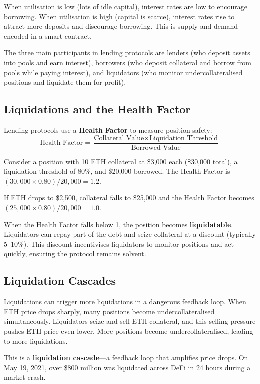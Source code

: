 \documentclass[11pt,a4paper]{article}
\newcommand{\keyword}[1]{\textbf{\textcolor{AccentOrange}{#1}}}
\begin{document}
When utilisation is low (lots of idle capital), interest rates are low to encourage borrowing. When utilisation is high (capital is scarce), interest rates rise to attract more deposits and discourage borrowing. This is supply and demand encoded in a smart contract.

The three main participants in lending protocols are lenders (who deposit assets into pools and earn interest), borrowers (who deposit collateral and borrow from pools while paying interest), and liquidators (who monitor undercollateralised positions and liquidate them for profit).

\subsection{Liquidations and the Health Factor}

Lending protocols use a \keyword{Health Factor} to measure position safety:
\[
\text{Health Factor} = \frac{\text{Collateral Value} \times \text{Liquidation Threshold}}{\text{Borrowed Value}}
\]

Consider a position with 10 ETH collateral at \$3,000 each (\$30,000 total), a liquidation threshold of 80\%, and \$20,000 borrowed. The Health Factor is $(30{,}000 \times 0.80) / 20{,}000 = 1.2$.

If ETH drops to \$2,500, collateral falls to \$25,000 and the Health Factor becomes $(25{,}000 \times 0.80) / 20{,}000 = 1.0$.

When the Health Factor falls below 1, the position becomes \keyword{liquidatable}. Liquidators can repay part of the debt and seize collateral at a discount (typically 5--10\%). This discount incentivises liquidators to monitor positions and act quickly, ensuring the protocol remains solvent.

\subsection{Liquidation Cascades}

Liquidations can trigger more liquidations in a dangerous feedback loop. When ETH price drops sharply, many positions become undercollateralised simultaneously. Liquidators seize and sell ETH collateral, and this selling pressure pushes ETH price even lower. More positions become undercollateralised, leading to more liquidations.

This is a \keyword{liquidation cascade}---a feedback loop that amplifies price drops. On May 19, 2021, over \$800 million was liquidated across DeFi in 24 hours during a market crash.
\end{document}
